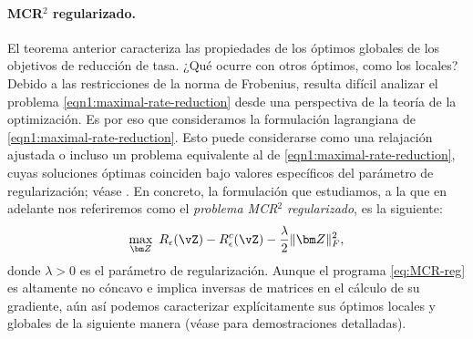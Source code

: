 \documentclass[../../book-main.tex]{subfiles}
\begin{document}
\paragraph{MCR$^2$ regularizado.}
El teorema anterior caracteriza las propiedades de los óptimos globales de
los objetivos de reducción de tasa. ¿Qué ocurre con otros óptimos, como los locales?
Debido a las restricciones de la norma de Frobenius, resulta
difícil analizar el problema \eqref{eqn1:maximal-rate-reduction}
desde una perspectiva de la teoría de la optimización. Es por eso que consideramos
la formulación lagrangiana de \eqref{eqn1:maximal-rate-reduction}. 
Esto puede considerarse como una relajación ajustada o incluso un problema equivalente
al de \eqref{eqn1:maximal-rate-reduction}, cuyas soluciones óptimas
coinciden bajo valores específicos del parámetro de regularización;
véase \cite[Proposition 3.2]{wang2024global}.
En concreto, la formulación que estudiamos, a la que en adelante nos referiremos como el
\textit{problema MCR$^2$ regularizado}, es la siguiente:
\begin{align}\label{eq:MCR-reg}
    \max_{\bm Z}\ R_{\epsilon}(\vZ) - R_{\epsilon}^c(\vZ) -
    \frac{\lambda}{2}\|\bm Z\|_F^2,
\end{align}
donde $\lambda > 0$ es el parámetro de regularización. Aunque el
programa \eqref{eq:MCR-reg} es altamente no cóncavo e implica
inversas de matrices en el cálculo de su gradiente, aún así podemos
caracterizar explícitamente sus óptimos locales y globales de la siguiente manera (véase
\cite[Theorem 3.1]{wang2024global} para demostraciones detalladas).
\end{document}
